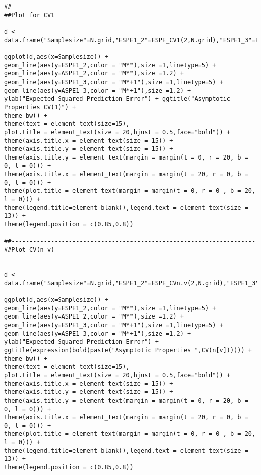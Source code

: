 \documentclass[Research_Module_ES.tex]{subfiles}
\begin{document}
\begin{lstlisting}[title={Simulation Graphic Ilustration Exspected Squared Prediction Error CV1 and CV($n_\nu$)}]
##--------------------------------------------------------------------
##Plot for CV1

d <- data.frame("Samplesize"=N.grid,"ESPE1_2"=ESPE_CV1(2,N.grid),"ESPE1_3"=ESPE_CV1(3,N.grid),"ASPE1_2"=CV1_d2,"ASPE1_3"=CV1_d3)

ggplot(d,aes(x=Samplesize)) +
geom_line(aes(y=ESPE1_2,color = "M*"),size =1,linetype=5) +
geom_line(aes(y=ASPE1_2,color = "M*"),size =1.2) +
geom_line(aes(y=ESPE1_3,color = "M*+1"),size =1,linetype=5) +
geom_line(aes(y=ASPE1_3,color = "M*+1"),size =1.2) +
ylab("Expected Squared Prediction Error") + ggtitle("Asymptotic Properties CV(1)") +
theme_bw() +
theme(text = element_text(size=15),
plot.title = element_text(size = 20,hjust = 0.5,face="bold")) +
theme(axis.title.x = element_text(size = 15)) +
theme(axis.title.y = element_text(size = 15)) +
theme(axis.title.y = element_text(margin = margin(t = 0, r = 20, b = 0, l = 0))) +
theme(axis.title.x = element_text(margin = margin(t = 20, r = 0, b = 0, l = 0))) +
theme(plot.title = element_text(margin = margin(t = 0, r = 0 , b = 20, l = 0))) +
theme(legend.title=element_blank(),legend.text = element_text(size = 13)) +
theme(legend.position = c(0.85,0.8))

##--------------------------------------------------------------------
##Plot CV(n_v)


d <- data.frame("Samplesize"=N.grid,"ESPE1_2"=ESPE_CVn.v(2,N.grid),"ESPE1_3"=ESPE_CVn.v(3,N.grid),"ASPE1_2"=MCCV1_d2,"ASPE1_3"=MCCV1_d3)

ggplot(d,aes(x=Samplesize)) +
geom_line(aes(y=ESPE1_2,color = "M*"),size =1,linetype=5) +
geom_line(aes(y=ASPE1_2,color = "M*"),size =1.2) +
geom_line(aes(y=ESPE1_3,color = "M*+1"),size =1,linetype=5) +
geom_line(aes(y=ASPE1_3,color = "M*+1"),size =1.2) +
ylab("Expected Squared Prediction Error") + ggtitle(expression(bold(paste("Asymptotic Properties ",CV(n[v]))))) +
theme_bw() +
theme(text = element_text(size=15),
plot.title = element_text(size = 20,hjust = 0.5,face="bold")) +
theme(axis.title.x = element_text(size = 15)) +
theme(axis.title.y = element_text(size = 15)) +
theme(axis.title.y = element_text(margin = margin(t = 0, r = 20, b = 0, l = 0))) +
theme(axis.title.x = element_text(margin = margin(t = 20, r = 0, b = 0, l = 0))) +
theme(plot.title = element_text(margin = margin(t = 0, r = 0 , b = 20, l = 0))) +
theme(legend.title=element_blank(),legend.text = element_text(size = 13)) +
theme(legend.position = c(0.85,0.8))
\end{lstlisting}
\end{document}
